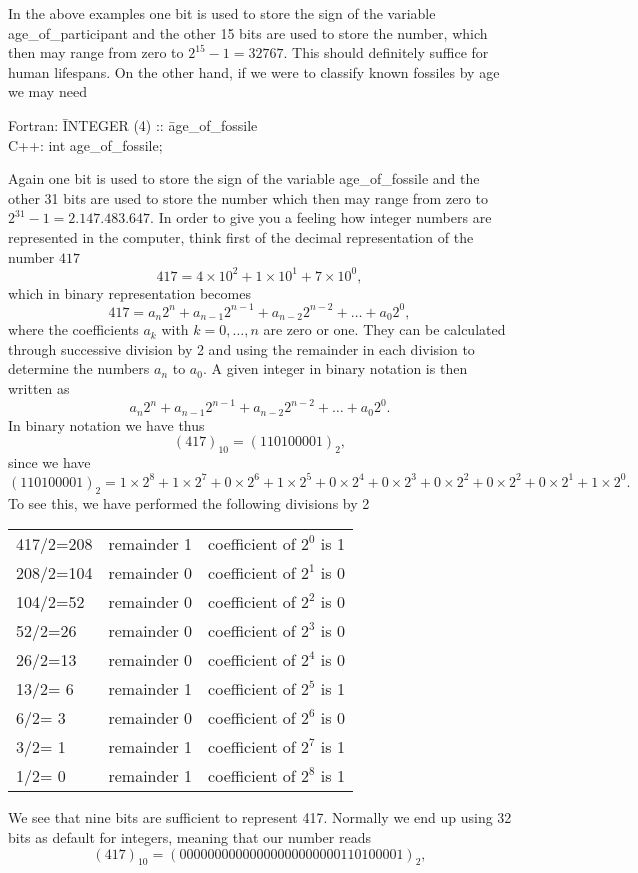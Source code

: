 In the above examples one bit is used to store the sign of the variable
age\_of\_participant and the 
other 15 bits are used to store the number, which then
may range from zero to $2^{15}-1=32767$.
This should definitely suffice for human lifespans.
On the other hand, if we were to classify known fossiles by age we may need
%
%
\begin{tabbing}
%
Fortran: \hspace*{1cm}\=INTEGER (4) :: \=age\_of\_fossile\\
C++:                    \> int           \>age\_of\_fossile;
\end{tabbing}
%
Again one bit is used to store the sign of the variable
age\_of\_fossile and the 
other 31 bits are used to store the number which then 
may range from zero to $2^{31}-1=2.147.483.647$.
In order to give you a feeling how integer numbers are represented
in the computer, think first of the decimal representation of
the number $417$
%
\[
   417 = 4\times 10^{2}+1\times 10^{1} + 7\times 10^{0},
\]
%
which  in binary representation becomes
%
\[
  417=a_n2^n+a_{n-1}2^{n-1}  +a_{n-2}2^{n-2}  +\dots +a_{0}2^{0},
\]
%
where the coefficients $a_k$ with $k = 0,\ldots ,n$ are zero or one. They can be
calculated through successive division by 2 and using the remainder
in each division to determine the numbers $a_n$ to $a_0$.  A given integer in
binary notation is then written as 
\[
  a_n2^n+a_{n-1}2^{n-1}  +a_{n-2}2^{n-2}  +\dots +a_{0}2^{0}.
\]
%
In binary notation we have thus
%
\[
   (417)_{10} =(110100001)_2,
\]
since we have
\[
(110100001)_2
=1\times2^8+1\times 2^{7}+0\times 2^{6}+1\times 2^{5}+0\times 2^{4}+0\times 2^{3}+0\times 2^{2}+0\times 2^{2}+0\times 2^{1}+1\times 2^{0}.
\]
To see this, we have performed the following divisions by 2
\begin{center}
\begin{tabular}{lcc}\hline
417/2=208  & remainder 1& coefficient of $2^{0}$ is 1\\
208/2=104  & remainder 0& coefficient of $2^{1}$ is 0\\
104/2=52  & remainder 0& coefficient of $2^{2}$ is 0\\
52/2=26  & remainder 0& coefficient of $2^{3}$ is 0\\
26/2=13  & remainder 0& coefficient of $2^{4}$ is 0\\
13/2= 6 & remainder 1& coefficient of $2^{5}$ is 1\\
6/2= 3 & remainder 0& coefficient of $2^{6}$ is 0\\
3/2= 1 & remainder 1& coefficient of $2^{7}$ is 1\\
1/2= 0 & remainder 1& coefficient of $2^{8}$ is 1\\
\hline\end{tabular}%
\end{center}
We see that nine bits are sufficient to represent 417.
Normally we end up using 32 bits as default for integers, meaning that our number reads
\[
   (417)_{10} =(00000000000000000000000110100001)_2,
\]


